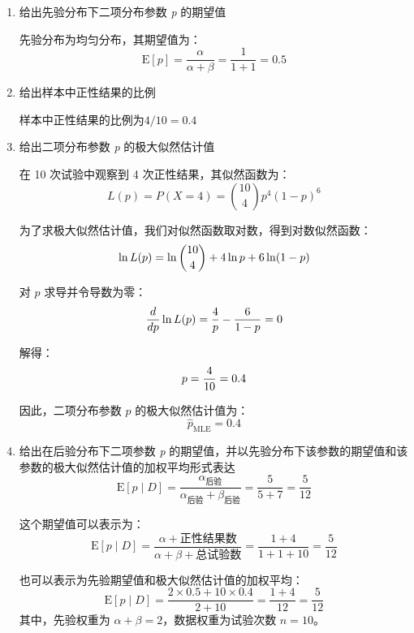 \documentclass[stu,12pt,floatsintext]{apa7} %
\begin{document}
\begin{enumerate}[itemsep=2pt,topsep=0pt,parsep=0pt,label=(\alph*)]
    \item 给出先验分布下二项分布参数 \textit{p} 的期望值
    
    先验分布为均匀分布，其期望值为：
    \setlength\abovedisplayskip{0.7em}
    \setlength\belowdisplayskip{0.7em}
    \[
    \text{E}[p] = \frac{\alpha}{\alpha + \beta} = \frac{1}{1 + 1} = 0.5
    \]

    \item 给出样本中正性结果的比例
    
    样本中正性结果的比例为\(4 / 10 = 0.4\)
    
    \item  给出二项分布参数 \textit{p} 的极大似然估计值
    

    在 10 次试验中观察到 4 次正性结果，其似然函数为：
    \setlength\abovedisplayskip{0.7em}
    \setlength\belowdisplayskip{0.7em}
    \[
    L(p) = P(X = 4) = \binom{10}{4} p^4 (1-p)^{6}
    \]

    为了求极大似然估计值，我们对似然函数取对数，得到对数似然函数：
    \[
    \setlength\abovedisplayskip{0.7em}
    \setlength\belowdisplayskip{0.7em}
    \ln L(p) = \ln \binom{10}{4} + 4 \ln p + 6 \ln (1-p)
    \]

    对 \(p\) 求导并令导数为零：
    \[
    \setlength\abovedisplayskip{0.7em}
    \setlength\belowdisplayskip{0.7em}
    \frac{d}{dp} \ln L(p) = \frac{4}{p} - \frac{6}{1-p} = 0
    \]

    解得：
    \[
    \setlength\abovedisplayskip{0.7em}
    \setlength\belowdisplayskip{0.7em}
    p = \frac{4}{10} = 0.4
    \]

    因此，二项分布参数 \(p\) 的极大似然估计值为：
    \setlength\abovedisplayskip{0.7em}
    \setlength\belowdisplayskip{0.7em}
    \[
    \hat{p}_{\text{MLE}} = 0.4
    \]
    
    \item  给出在后验分布下二项参数 \textit{p} 的期望值，并以先验分布下该参数的期望值和该参数的极大似然估计值的加权平均形式表达
    \[
    \text{E}[p \mid D] = \frac{\alpha_{\text{后验}}}{\alpha_{\text{后验}} + \beta_{\text{后验}}} = \frac{5}{5 + 7} = \frac{5}{12} 
    \]
    
    这个期望值可以表示为：
    \setlength\abovedisplayskip{0.7em}
    \setlength\belowdisplayskip{0.7em}
    \[
    \text{E}[p \mid D] = \frac{\alpha + \text{正性结果数}}{\alpha + \beta + \text{总试验数}} = \frac{1 + 4}{1 + 1 + 10} = \frac{5}{12}
    \]
    
    也可以表示为先验期望值和极大似然估计值的加权平均：
    \setlength{\abovedisplayskip}{0.5em}
    \setlength{\belowdisplayskip}{0.5em}
    \[
        \text{E}[p \mid D] = \frac{2 \times 0.5 + 10 \times 0.4}{2 + 10} = \frac{1 + 4}{12} = \frac{5}{12} 
    \]
    其中，先验权重为 \(\alpha + \beta = 2\)，数据权重为试验次数 \(n = 10\)。
\end{enumerate}
\end{document}
